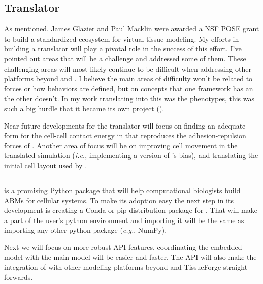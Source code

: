 \subsection{Translator}\label{sec:disc:future:trans}

As mentioned, James Glazier and Paul Macklin were awarded a NSF POSE grant to build a standardized ecosystem for virtual tissue modeling. My efforts in building a translator will play a pivotal role in the success of this effort. I've pointed out areas that will be a challenge and addressed some of them. These challenging areas will most likely continue to be difficult when addressing other platforms beyond \ccds and \psc. I believe the main areas of difficulty won't be related to forces or how behaviors are defined, but on concepts that one framework has an the other doesn't. In my work translating \pscs into \ccds this was the phenotypes, this was such a big hurdle that it became its own project (\pcp).

Near future developments for the translator will focus on finding an adequate form for the cell-cell contact energy in \ccds that reproduces the adhesion-repulsion forces of \psc. Another area of focus will be on improving cell movement in the translated simulation (\textit{i.e.}, implementing a version of \psc's bias), and translating the initial cell layout used by \psc.


\subsection{\pcp}\label{sec:disc:future:pheno}

\pcps is a promising Python package that will help computational biologists build ABMs for cellular systems. To make its adoption easy the next step in its development is creating a Conda or pip distribution package for \pcp. That will make \pcp a part of the user's python environment and importing it will be the same as importing any other python package (\textit{e.g.}, NumPy).

Next we will focus on more robust API features, coordinating the embedded \pcps model with the main model will be easier and faster. The API will also make the integration of \pcps with other modeling platforms beyond \ccds and TissueForge straight forwards.


